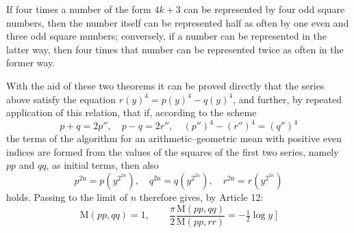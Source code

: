 If four times a number of the form $4k+3$ can be represented by four odd square numbers, then the number itself can be represented half as often by one even and three odd square numbers; conversely, if a number can be represented in the latter way, then four times that number can be represented twice as often in the former way.

With the aid of these two theorems it can be proved directly that the series above satisfy the equation $r(y)^4=p(y)^4-q(y)^4$, and further, by %
repeated application of this relation, that if, according to the scheme
\[
p+q=2p'',\quad p-q=2r'',\quad(p'')^4-(r'')^4=(q'')^4
\]
the terms of the algorithm for an arithmetic–geometric mean with positive even indices are formed from the values of the squares of the first two series, namely $pp$ and $qq$, as initial terms, then also
\[
p^{2\mathrm n}=p(y^{2^{2n}}),\quad q^{2\mathrm n}=q(y^{2^{2n}}),\quad r^{2\mathrm n}=r(y^{2^{2n}})
\]
holds. Passing to the limit of $n$ therefore gives, by Article 12:
\[
\mathrm M(pp,qq)=1,\qquad
\frac\pi2\frac{\mathrm M(pp,qq)}{\mathrm M(pp,rr)}=-\tfrac12\log y\ ]
\]

\clearpage
\endgroup
